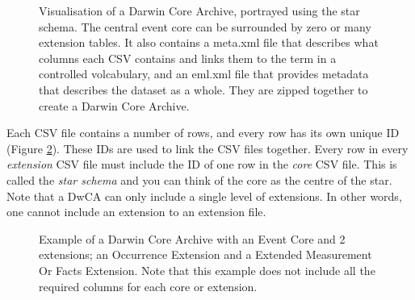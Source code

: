 \documentclass[a4paper,english, 11pt]{article}
\begin{document}
\begin{figure}[htb]
    \caption{\label{fig:dwca}
        Visualisation of a Darwin Core Archive, portrayed using the star schema. The
        central event core can be surrounded by zero or many extension tables.
        It also contains a meta.xml file that describes what columns each CSV contains and links them to the term in a controlled volcabulary, and an eml.xml file that provides metadata that describes the dataset as a whole. They are zipped together to create a Darwin Core Archive.
    }
\end{figure}

Each CSV file contains a number of rows, and every row has its own unique ID (Figure \ref{fig:csvs}). These IDs are used to link the CSV files together. Every row in every \textit{extension} CSV file must include the ID of one row in the \textit{core} CSV file. This is called the \textit{star schema} and you can think of the core as the centre of the star. Note that a DwCA can only include a single level of extensions. In other words, one cannot include an extension to an extension file.

\begin{figure}[htb]
    \caption{\label{fig:csvs}
        Example of a Darwin Core Archive with an Event Core and 2 extensions; an Occurrence Extension and a Extended Measurement Or Facts Extension. Note that this example does not include all the required columns for each core or extension. 
    }
\end{figure}
\end{document}
